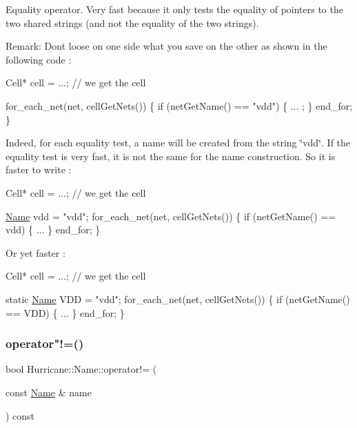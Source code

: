 Equality operator. Very fast because it only tests the equality of pointers to the two shared strings (and not the equality of the two strings).

\begin{DoxyParagraph}{Remark\+: Don\textquotesingle{}t loose on one side what you save on the other as shown }
in the following code \+: 
\begin{DoxyCode}
Cell* cell = ...; \textcolor{comment}{// we get the cell}
 
for\_each\_net(net, cellGetNets()) \{
   \textcolor{keywordflow}{if} (netGetName() == \textcolor{stringliteral}{"vdd"}) \{
      ... ;
   \}
   end\_for;
\}
\end{DoxyCode}
 Indeed, for each equality test, a name will be created from the string \char`\"{}vdd\char`\"{}. If the equality test is very fast, it is not the same for the name construction. So it is faster to write \+: 
\begin{DoxyCode}
Cell* cell = ...; \textcolor{comment}{// we get the cell}
 
\mbox{\hyperlink{classHurricane_1_1Name_a42636ecb0d4d7d03eb881420a244038b}{Name}} vdd = \textcolor{stringliteral}{"vdd"};
for\_each\_net(net, cellGetNets()) \{
   \textcolor{keywordflow}{if} (netGetName() == vdd) \{
      ...
   \}
   end\_for;
\}
\end{DoxyCode}
 Or yet faster \+: 
\begin{DoxyCode}
Cell* cell = ...; \textcolor{comment}{// we get the cell}
 
\textcolor{keyword}{static} \mbox{\hyperlink{classHurricane_1_1Name_a42636ecb0d4d7d03eb881420a244038b}{Name}} VDD = \textcolor{stringliteral}{"vdd"};
for\_each\_net(net, cellGetNets()) \{
   \textcolor{keywordflow}{if} (netGetName() == VDD) \{
      ...
   \}
   end\_for;
\}
\end{DoxyCode}
 
\end{DoxyParagraph}
\mbox{\label{classHurricane_1_1Name_aff97f0bcf698ad76f6f3c9a4c4833cc3}} 
\subsubsection{\texorpdfstring{operator"!=()}{operator!=()}}
{\footnotesize\ttfamily bool Hurricane\+::\+Name\+::operator!= (\begin{DoxyParamCaption}\item[{const \mbox{\hyperlink{classHurricane_1_1Name}{Name}} \&}]{name }\end{DoxyParamCaption}) const}

